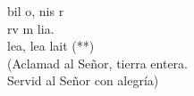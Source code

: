 \begin{cancion}%
	bil o, nis r\\
	rv m  lia.\\
\jump
	lea, lea  lait (**)\\
(Aclamad al Señor, tierra entera.\\
 Servid al Señor con alegría)\\
\end{cancion}%
